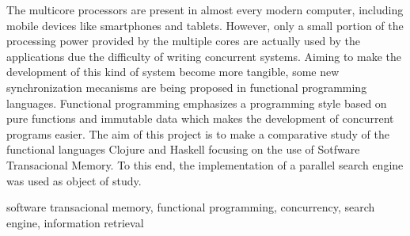 The multicore processors are present in almost every modern computer, including mobile devices like smartphones and tablets. However, only a small portion of the processing power provided by the multiple cores are actually used by the applications due the difficulty of writing concurrent systems. Aiming to make the development of this kind of system become more tangible, some new synchronization mecanisms are being proposed in functional programming languages. Functional programming emphasizes a programming style based on pure functions and immutable data which makes the development of concurrent programs easier. The aim of this project is to make a comparative study of the functional languages Clojure and Haskell focusing on the use of Sotfware Transacional Memory. To this end, the implementation of a parallel search engine was used as object of study.

\begin{keywords}
software transacional memory, functional programming, concurrency, search engine, information retrieval
\end{keywords} 
